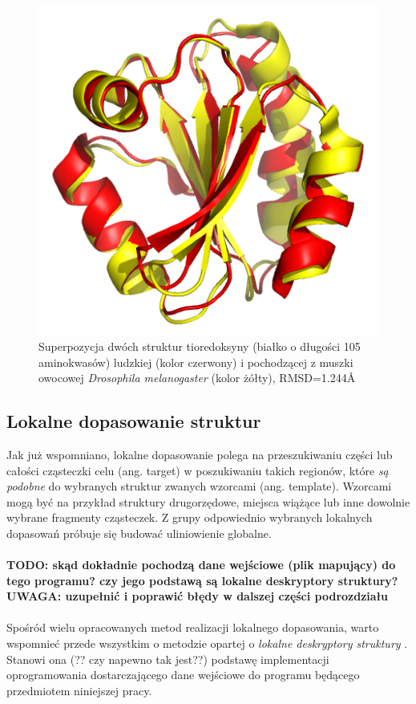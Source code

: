 \documentclass[licencjacka]{pracamgr}
\begin{document}
\begin{figure}[H]
\centering
\includegraphics[scale=0.7]{global_superposition}
\caption{Superpozycja dwóch struktur tioredoksyny (białko o długości 105 aminokwasów) ludzkiej (kolor czerwony) i pochodzącej z muszki owocowej \textit{Drosophila melanogaster} (kolor żółty), RMSD=1.244\AA }
\end{figure}

\subsection{Lokalne dopasowanie struktur} 
Jak już wspomniano, lokalne dopasowanie polega na przeszukiwaniu części lub całości cząsteczki celu (ang. target) w poszukiwaniu takich regionów, które \textit{są podobne} do wybranych struktur zwanych wzorcami (ang. template). Wzorcami mogą być na przykład struktury drugorzędowe, miejsca wiążące lub inne dowolnie wybrane fragmenty cząsteczek. Z grupy odpowiednio wybranych lokalnych dopasowań próbuje się budować uliniowienie globalne.
\\
\\
\textbf{TODO: skąd dokładnie pochodzą dane wejściowe (plik mapujący) do tego programu? czy jego podstawą są lokalne deskryptory struktury? }
\\
\textbf{UWAGA: uzupełnić i poprawić błędy w dalszej części podrozdziału}
\\
\\
Spośród wielu opracowanych metod realizacji lokalnego dopasowania, warto wspomnieć przede wszystkim o metodzie opartej o \textit{lokalne deskryptory struktury} \cite{daniluk11}. Stanowi ona (?? czy napewno tak jest??) podstawę implementacji oprogramowania dostarczającego dane wejściowe do programu będącego przedmiotem niniejszej pracy. 
\end{document}
